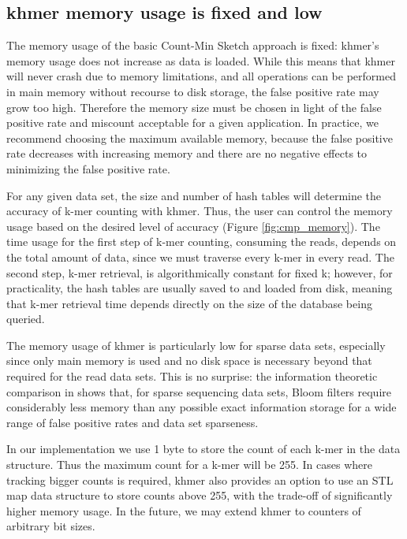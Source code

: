 \subsection{khmer memory usage is fixed and low}

The memory usage of the basic Count-Min Sketch approach is fixed:
khmer's memory usage does not increase as data is loaded. While this
means that khmer will never crash due to memory limitations, and all
operations can be performed in main memory without recourse to disk
storage, the false positive rate may grow too high.  Therefore the
memory size must be chosen in light of the false positive rate and
miscount acceptable for a given application.  In practice, we
recommend choosing the maximum available memory, because the false
positive rate decreases with increasing memory and there are no
negative effects to minimizing the false positive rate.

For any given data set, the size and number of hash tables will
determine the accuracy of k-mer counting with khmer.  Thus, the user
can control the memory usage based on the desired level of accuracy
(Figure \ref{fig:cmp_memory}). The time usage for the first step of
k-mer counting, consuming the reads, depends on the total amount of
data, since we must traverse every k-mer in every read.  The second
step, k-mer retrieval, is algorithmically constant for fixed k;
however, for practicality, the hash tables are usually saved to and
loaded from disk, meaning that k-mer retrieval time depends directly
on the size of the database being queried.

The memory usage of khmer is particularly low for sparse data sets,
especially since only main memory is used and no disk space is
necessary beyond that required for the read data sets.  This is no
surprise: the information theoretic comparison in \cite{Pell2012}
shows that, for sparse sequencing data sets, Bloom filters require
considerably less memory than any possible exact information storage
for a wide range of false positive rates and data set sparseness.

In our implementation we use 1 byte to store the count of each k-mer
in the data structure. Thus the maximum count for a k-mer will be 255.
In cases where tracking bigger counts is required, khmer also provides
an option to use an STL map data structure to store counts above 255,
with the trade-off of significantly higher memory usage.  In the
future, we may extend khmer to counters of arbitrary bit sizes.


